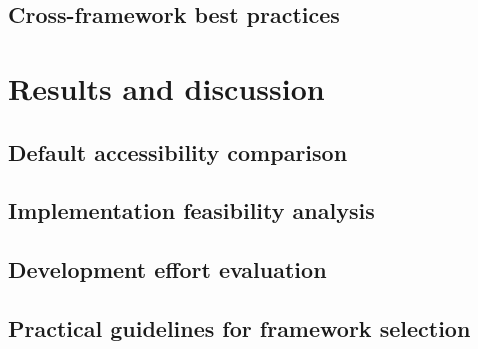 \subsection{Cross-framework best practices}

\section{Results and discussion}
\subsection{Default accessibility comparison}
\subsection{Implementation feasibility analysis}
\subsection{Development effort evaluation}
\subsection{Practical guidelines for framework selection}